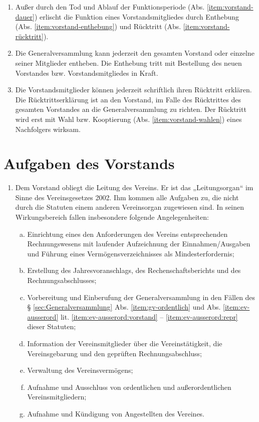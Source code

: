 \documentclass[a4paper,12pt]{article}
\begin{document}
\begin{enumerate}
\item\label{item:vorstand-tod-ablauf} Außer durch den Tod und Ablauf der Funktionsperiode (Abs. \ref{item:vorstand-dauer}) erlischt die Funktion eines Vorstandsmitgliedes durch Enthebung (Abs. \ref{item:vorstand-enthebung}) und Rücktritt (Abs. \ref{item:vorstand-rücktritt}).
\item\label{item:vorstand-enthebung} Die Generalversammlung kann jederzeit den gesamten Vorstand oder einzelne seiner Mitglieder entheben. Die Enthebung tritt mit Bestellung des neuen Vorstandes bzw. Vorstandsmitgliedes in Kraft.
\item\label{item:vorstand-rücktritt} Die Vorstandsmitglieder können jederzeit schriftlich ihren Rücktritt erklären. Die Rücktrittserklärung ist an den Vorstand, im Falle des Rücktrittes des gesamten Vorstandes an die Generalversammlung zu richten. Der Rücktritt wird erst mit Wahl bzw. Kooptierung (Abs. \ref{item:vorstand-wahlen}) eines Nachfolgers wirksam.
\end{enumerate}


\section{Aufgaben des Vorstands} %
\label{sec:Vorstand-Aufgaben}
\begin{enumerate}
\item Dem Vorstand obliegt die Leitung des Vereins. Er ist das „Leitungsorgan“ im Sinne des Vereinsgesetzes 2002. Ihm kommen alle Aufgaben zu, die nicht durch die Statuten einem anderen Vereinsorgan zugewiesen sind. In seinen Wirkungsbereich fallen insbesondere folgende Angelegenheiten:
 \begin{enumerate}[(a)]
 \item Einrichtung eines den Anforderungen des Vereins entsprechenden Rechnungswesens mit laufender Aufzeichnung der Einnahmen/Ausgaben und Führung eines Vermögensverzeichnisses als Mindesterfordernis;
 \item Erstellung des Jahresvoranschlags, des Rechenschaftsberichts und des Rechnungsabschlusses;
 \item Vorbereitung und Einberufung der Generalversammlung in den Fällen des § \ref{sec:Generalversammlung} Abs. \ref{item:gv-ordentlich} und Abs. \ref{item:ev-ausserord} lit. \ref{item:ev-ausserord:vorstand} – \ref{item:ev-ausserord:repr} dieser Statuten;
 \item Information der Vereinsmitglieder über die Vereinstätigkeit, die Vereinsgebarung und den geprüften Rechnungsabschluss;
 \item Verwaltung des Vereinsvermögens;
 \item Aufnahme und Ausschluss von ordentlichen und außerordentlichen Vereinsmitgliedern;
 \item Aufnahme und Kündigung von Angestellten des Vereines.
 \end{enumerate}
\end{enumerate}
\end{document}
